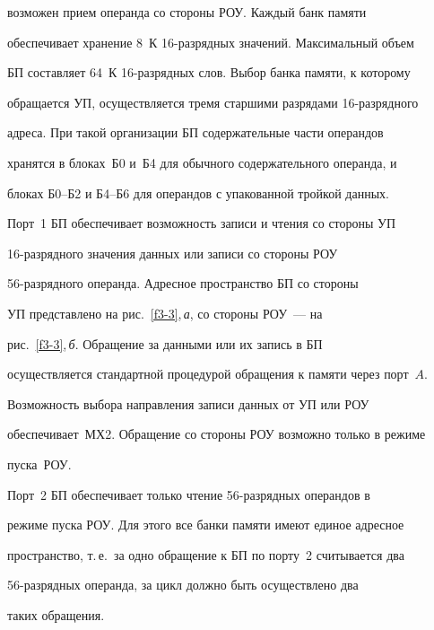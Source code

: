 возможен прием операнда со стороны РОУ. Каждый банк памяти 


обеспечивает хранение 8~К 16-раз\-ряд\-ных значений. Максимальный объем 


БП со\-став\-ля\-ет 64~К 16-раз\-ряд\-ных слов. Выбор банка памяти, к которому 


обращается УП, осуществляется тре\-мя старшими разрядами 16-раз\-ряд\-но\-го 


адреса. При такой организации БП содержательные части операндов 


хранятся в блоках~Б0 и~Б4 для обычного содержательного операнда, и 


блоках Б0--Б2 и Б4--Б6 для операндов с упакованной тройкой данных.


      


      Порт~1 БП обеспечивает возможность записи и чтения со стороны УП 


16-раз\-ряд\-но\-го значения данных или записи со стороны РОУ 


      56-раз\-ряд\-но\-го операнда. Адресное пространство БП со стороны 


УП представлено на рис.~\ref{f3-3},\,\textit{а}, со стороны РОУ~--- на 


рис.~\ref{f3-3},\,\textit{б}. Обращение за данными или их запись в БП 


осуществляется стандартной процедурой обращения к памяти через порт~$A$. 


Возможность выбора направления записи данных от УП или РОУ 


обеспечивает~МХ2. Обращение со стороны РОУ возможно только в режиме 


пус\-ка~РОУ.


      


      Порт~2 БП обеспечивает только чтение 56-раз\-ряд\-ных операндов в 


режиме пуска РОУ. Для этого все банки памяти имеют единое адресное 


пространство, т.\,е.\ за одно обращение к БП по порту~2 считывается два 


      56-раз\-ряд\-ных операнда, за цикл должно быть осуществлено два 


таких обращения.





